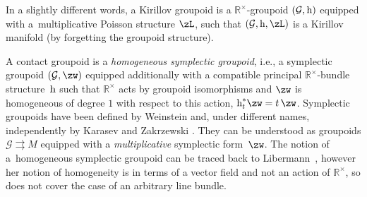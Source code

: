 \documentclass[pdftex]{sigma}
\newcommand{\rmh}{\textnormal{h}}
\newcommand{\R}{{\mathbb R}}
\newcommand{\ti}{\times}
\def\Rt{{\R^\times}}
\def\cG{\mathcal{G}}
\numberwithin{equation}{section}
\begin{document}
In a slightly dif\/ferent words, a Kirillov groupoid is a $\mathbb{R}^{\times}$-groupoid $(\mathcal{G}, \rmh)$ equipped with a~multiplicative Poisson structure $\zL$, such that $(\mathcal{G}, \rmh , \zL)$ is a Kirillov manifold (by forgetting the groupoid structure).

\begin{Remark} A contact groupoid is a \emph{homogeneous symplectic groupoid}, i.e., a symplectic groupoid $(\cG,\zw)$ equipped additionally with a compatible principal $\Rt$-bundle structure~$\rmh$ such that $\Rt$ acts by groupoid isomorphisms and $\zw$ is homogeneous of degree $1$ with respect to this action, $\rmh_t^*\zw=t\,\zw$. Symplectic groupoids have been def\/ined by Weinstein \cite{Weinstein:1987} and, under dif\/ferent names, independently by Karasev \cite{Karasev:1987} and Zakrzewski \cite{Zakrzewski:1990,Zakrzewski:1990a}. They can be understood as groupoids $\cG\rightrightarrows M$ equipped with a \emph{multiplicative} symplectic form~$\zw$. The notion of a~homogeneous symplectic groupoid can be traced back to Libermann~\cite{Libermann:1995}, however her notion of homogeneity is in terms of a vector f\/ield and not an action of $\R^\ti$, so does not cover the case of an arbitrary line bundle.
\end{Remark}
\end{document}
